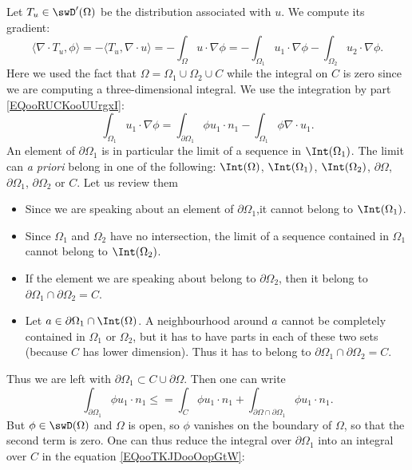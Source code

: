 Let \( T_u\in \swD'(\Omega)\) be the distribution associated with \( u\). We compute its gradient:
\begin{equation}
	\langle \nabla\cdot T_u, \phi\rangle =-\langle T_u, \nabla\cdot u\rangle =-\int_{\Omega}u\cdot\nabla \phi=-\int_{\Omega_1}u_1\cdot \nabla \phi-\int_{\Omega_2}u_2\cdot \nabla \phi.
\end{equation}
Here we used the fact that \( \Omega=\Omega_1\cup \Omega_2\cup C\) while the integral on \( C\) is zero since we are computing a three-dimensional integral. We use the integration by part \eqref{EQooRUCKooUUrgxI}:
\begin{equation}        \label{EQooTKJDooOopGtW}
	\int_{\Omega_1}u_1\cdot \nabla\phi=\int_{\partial \Omega_1}\phi u_1\cdot n_1-\int_{\Omega_1}\phi\nabla\cdot u_1.
\end{equation}
An element of \( \partial \Omega_1\) is in particular the limit of a sequence in \( \Int(\Omega_1)\). The limit can \emph{a priori} belong in one of the following: \( \Int(\Omega)\), \( \Int(\Omega_1)\), \( \Int(\Omega_2)\), \( \partial \Omega\), \( \partial \Omega_1\), \( \partial\Omega_2\) or \( C\). Let us review them
\begin{itemize}
	\item Since we are speaking about an element of \( \partial\Omega_1\),it cannot belong to \( \Int(\Omega_1)\).
	\item Since \( \Omega_1\) and \( \Omega_2\) have no intersection, the limit of a sequence contained in \( \Omega_1\) cannot belong to \( \Int(\Omega_2)\).
	\item If the element we are speaking about belong to \( \partial \Omega_2\), then it belong to \( \partial\Omega_1\cap\partial\Omega_2=C\).
	\item Let \( a\in\partial \Omega_1\cap \Int(\Omega)\). A neighbourhood around \( a\) cannot be completely contained in \( \Omega_1\) or \( \Omega_2\), but it has to have parts in each of these two sets (because \( C\) has lower dimension). Thus it has to belong to \( \partial \Omega_1\cap\partial\Omega_2=C\).
\end{itemize}
Thus we are left with \( \partial\Omega_1\subset C\cup\partial\Omega\). Then one can write
\begin{equation}
	\int_{\partial \Omega_1}\phi u_1\cdot n_1\leq =\int_{C}\phi u_1\cdot n_1+\int_{\partial \Omega\cap\partial\Omega_1}\phi u_1\cdot n_1.
\end{equation}
But \( \phi\in \swD(\Omega)\) and \( \Omega\) is open, so \( \phi\) vanishes on the boundary of \( \Omega\), so that the second term is zero. One can thus reduce the integral over \( \partial\Omega_1\) into an integral over \( C\) in the equation \eqref{EQooTKJDooOopGtW}:
